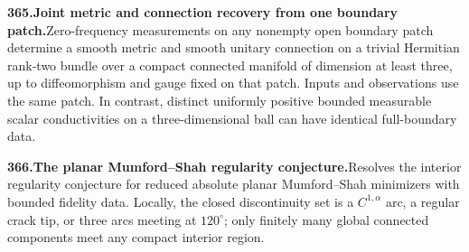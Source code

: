 \documentclass[11pt,a4paper]{article}
\begin{document}
  \par \begin{minipage}{\linewidth}
  \fontsize{10.5}{12.6}\selectfont\RaggedRight
  \hypertarget{result 365}{}
  {\bfseries\textcolor{muted}{365.}\enspace Joint metric and connection recovery from one boundary patch.}\enspace Zero-frequency measurements on any nonempty open boundary patch determine a smooth metric and smooth unitary connection on a trivial Hermitian rank-two bundle over a compact connected manifold of dimension at least three, up to diffeomorphism and gauge fixed on that patch. Inputs and observations use the same patch. In contrast, distinct uniformly positive bounded measurable scalar conductivities on a three-dimensional ball can have identical full-boundary data.\par
  \end{minipage}\par\vspace{5pt}



  \par \begin{minipage}{\linewidth}
  \fontsize{10.5}{12.6}\selectfont\RaggedRight
  \hypertarget{result 366}{}
  {\bfseries\textcolor{muted}{366.}\enspace The planar Mumford--Shah regularity conjecture.}\enspace Resolves the interior regularity conjecture for reduced absolute planar Mumford--Shah minimizers with bounded fidelity data. Locally, the closed discontinuity set is a $C^{1,\alpha}$ arc, a regular crack tip, or three arcs meeting at $120^\circ$; only finitely many global connected components meet any compact interior region.\par
  \end{minipage}\par\vspace{5pt}
\end{document}

